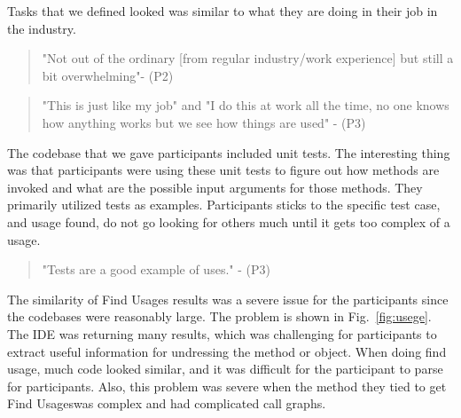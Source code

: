 \documentclass[conference]{IEEEtran}
\begin{document}
Tasks that we defined looked was similar to what they are doing in their job in the industry. 
\begin{quote}
"Not out of the ordinary [from regular industry/work experience] but still a bit overwhelming"- (P2)
\end{quote}
\begin{quote} "This is just like my job" and "I do this at work all the time, no one knows how anything works but we see how things are used"
- (P3)
\end{quote}
The codebase that we gave participants included unit tests. The interesting thing was that participants were using these unit tests to figure out how methods are invoked and what are the possible input arguments for those methods. They primarily utilized tests as examples. Participants sticks to the specific test case, and usage found, do not go looking for others much until it gets too complex of a usage.

\begin{quote} "Tests are a good example of uses." - (P3)\end{quote}

The similarity of Find Usages results was a severe issue for the participants since the codebases were reasonably large. The problem is shown in Fig.~\ref{fig:usege}. The IDE was returning many results, which was challenging for participants to extract useful information for undressing the method or object. When doing find usage, much code looked similar, and it was difficult for the participant to parse for participants. Also, this problem was severe when the method they tied to get Find Usageswas complex and had complicated call graphs.
\end{document}
